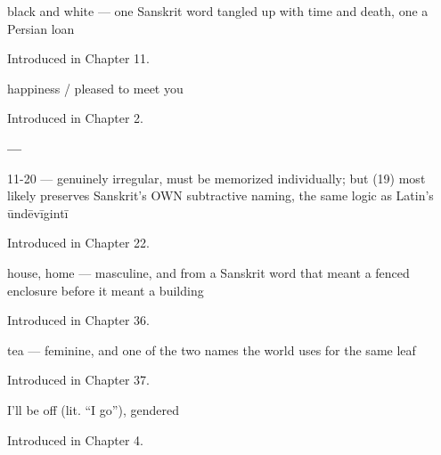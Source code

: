 \noindent\begin{minipage}[t]{\linewidth}
\raggedright
\textbf{ }\par
\small black and white — one Sanskrit word tangled up with time and death, one a Persian loan\par
\footnotesize Introduced in Chapter 11.
\end{minipage}\par\medskip

\noindent\begin{minipage}[t]{\linewidth}
\raggedright
\textbf{}\par
\small happiness / pleased to meet you\par
\footnotesize Introduced in Chapter 2.
\end{minipage}\par\medskip

\noindent\begin{minipage}[t]{\linewidth}
\raggedright
\textbf{ — }\par
\small 11-20 — genuinely irregular, must be memorized individually; but  (19) most likely preserves Sanskrit's OWN subtractive naming, the same logic as Latin's ūndēvīgintī\par
\footnotesize Introduced in Chapter 22.
\end{minipage}\par\medskip

\noindent\begin{minipage}[t]{\linewidth}
\raggedright
\textbf{}\par
\small house, home — masculine, and from a Sanskrit word that meant a fenced enclosure before it meant a building\par
\footnotesize Introduced in Chapter 36.
\end{minipage}\par\medskip

\noindent\begin{minipage}[t]{\linewidth}
\raggedright
\textbf{}\par
\small tea — feminine, and one of the two names the world uses for the same leaf\par
\footnotesize Introduced in Chapter 37.
\end{minipage}\par\medskip

\noindent\begin{minipage}[t]{\linewidth}
\raggedright
\textbf{ }\par
\small I'll be off (lit. \textquotedblleft{}I go\textquotedblright{}), gendered\par
\footnotesize Introduced in Chapter 4.
\end{minipage}\par\medskip

